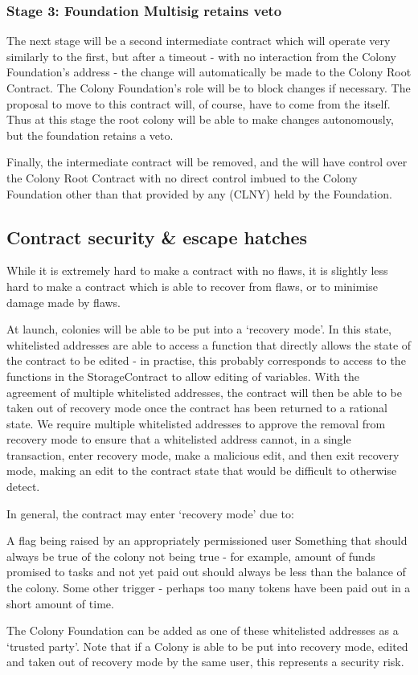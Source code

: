 \subsubsection*{Stage 3: Foundation Multisig retains veto}
The next stage will be a second intermediate contract which will operate very similarly to the first, but after a timeout - with no interaction from the Colony Foundation's address - the change will automatically be made to the Colony Root Contract. The Colony Foundation’s role will be to block changes if necessary. The proposal to move to this contract will, of course, have to come from the \rc itself.  Thus at this stage the root colony will be able to make changes autonomously, but the foundation retains a veto.

Finally, the intermediate contract will be removed, and the \rc will have control over the Colony Root Contract with no direct control imbued to the Colony Foundation other than that provided by any \rct (CLNY) held by the Foundation. 

\subsection{Contract security \& escape hatches}
While it is extremely hard to make a contract with no flaws, it is slightly less hard to make a contract which is able to recover from flaws, or to minimise damage made by flaws.

At launch, colonies will be able to be put into a `recovery mode'. In this state, whitelisted addresses are able to access a function that directly allows the state of the contract to be edited - in practise, this probably corresponds to access to the functions in the StorageContract to allow editing of variables. With the agreement of multiple whitelisted addresses, the contract will then be able to be taken out of recovery mode once the contract has been returned to a rational state. We require multiple whitelisted addresses to approve the removal from recovery mode to ensure that a whitelisted address cannot, in a single transaction, enter recovery mode, make a malicious edit, and then exit recovery mode, making an edit to the contract state that would be difficult to otherwise detect.

In general, the contract may enter `recovery mode' due to:

A flag being raised by an appropriately permissioned user
Something that should always be true of the colony not being true - for example, amount of funds promised to tasks and not yet paid out should always be less than the balance of the colony.
Some other trigger - perhaps too many tokens have been paid out in a short amount of time.

The Colony Foundation can be added as one of these whitelisted addresses as a `trusted party'. Note that if a Colony is able to be put into recovery mode, edited and taken out of recovery mode by the same user, this represents a security risk.